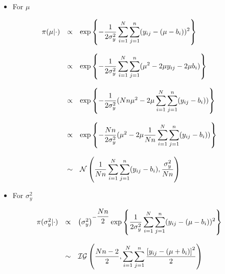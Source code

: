\documentclass{asaproc}
\begin{document}
\vfill
\begin{itemize}
\item For $\mu$
\end{itemize}

\begin{small}
\begin{eqnarray*}
\begin{array}{lcl ll }

\pi(\mu|\cdot) & \propto & \mbox{exp}\left\{ -\dfrac{1}{2\sigma_y^2}\displaystyle\sum_{i=1}^{N}\displaystyle\sum_{j=1}^{n}(y_{ij} - (\mu - b_i))^2\right\}\\ \\

& \propto & \mbox{exp}\left\{- \dfrac{1}{2\sigma_y^2}\displaystyle\sum_{i=1}^{N}\displaystyle\sum_{j=1}^{n}( \mu^2 - 2\mu y_{ij} - 2\mu b_i)\right\}\\ \\

& \propto & \mbox{exp}\left\{- \dfrac{1}{2\sigma_y^2}(Nn\mu^2 - 2\mu\displaystyle\sum_{i=1}^{N}\displaystyle\sum_{j=1}^{n}( y_{ij} - b_i))\right\}\\ \\

& \propto & \mbox{exp}\left\{- \dfrac{Nn}{2\sigma_y^2}(\mu^2 - 2\mu\dfrac{1}{Nn}\displaystyle\sum_{i=1}^{N}\displaystyle\sum_{j=1}^{n}( y_{ij} - b_i)) \right\}\\ \\
 
 
 & \sim & \mathcal{N}\left( \dfrac{1}{Nn} \displaystyle\sum_{i=1}^{N}\sum_{j=1}^{n} (y_{ij} - b_i) , \dfrac{\sigma_y^2}{Nn} \right) 
\end{array}
\end{eqnarray*}
\end{small}

\vfill

\begin{itemize}
\item For $\sigma_y^2$
\end{itemize}

\begin{small}
\begin{eqnarray*}
\begin{array}{lcl ll }
\pi(\sigma_y^2|\cdot)  & \propto & \left(\sigma_y^2\right)^{-\dfrac{Nn}{2}}\mbox{exp}\left\{ \dfrac{1}{2\sigma_y^2}\displaystyle\sum_{i=1}^{N}\displaystyle\sum_{j=1}^{n} (y_{ij} - (\mu - b_i))^2\right\}\\ \\
 
& \sim &  \mathcal{IG} \left( \dfrac{Nn - 2}{2} , \displaystyle\sum_{i=1}^{N}\sum_{j=1}^{n}\frac{\left[ y_{ij} - (\mu + b_i) \right]^2}{2} \right) 
\end{array}
\end{eqnarray*}
\end{small}
\end{document}
